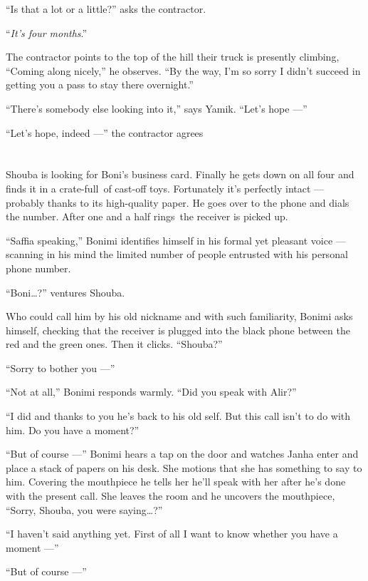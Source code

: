 \documentclass[twoside,11pt,openany]{book}
\begin{document}
``Is that a lot or a little?'' asks the contractor.

``\textit{It's four months}.''

The contractor points to the top of the hill their truck is presently climbing, ``Coming along nicely,'' he
observes. ``By the way, I'm so sorry I didn't succeed in getting you a pass to stay there overnight.''

``There's somebody else looking into it,'' says Yamik. ``Let's hope ---''

``Let's hope, indeed ---'' the contractor agrees


\chapter{}

Shouba is looking for Boni's business card. Finally he gets down on all four and finds it in a crate-full~of cast-off
toys. Fortunately it's perfectly intact ---  probably thanks to its high-quality paper. He goes over to the phone and
dials the number. After one and a half rings~the receiver is picked up.

``Saffia speaking,'' Bonimi identifies himself in his formal yet pleasant voice --- scanning in
his mind the limited number of people entrusted with his personal phone number.

``Boni{\ldots}?'' ventures Shouba.

Who could call him by his old nickname and with such familiarity, Bonimi asks himself, checking that the receiver is
plugged into the black phone between the red and the green ones. Then it clicks. ``Shouba?''

``Sorry to bother you ---''

``Not at all,'' Bonimi responds warmly. ``Did you speak with Alir?''

``I did and thanks to you he's back to his old self. But this call isn't to do with him. Do you have a
moment?''

``But of course ---'' Bonimi hears a tap on the door and watches Janha enter and place a stack
of papers on his desk. She motions that she has something to say to him. Covering the mouthpiece he tells her he'll
speak with her after he's done with the present call. She leaves the room and he uncovers the mouthpiece,
``Sorry, Shouba, you were saying{\ldots}?''

``I haven't said anything yet. First of all I want to know whether you have a moment ---''

``But of course ---''
\end{document}
